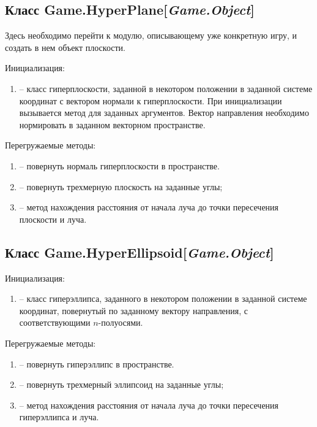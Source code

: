 \subsection{Класс Game.HyperPlane[\textit{Game.Object}]}
	Здесь необходимо перейти к модулю, описывающему уже конкретную игру, и создать в нем объект плоскости.

	\noindent Инициализация:
	\begin{enumerate}
		\item {} -- класс гиперплоскости, заданной в некотором положении в заданной системе координат с вектором нормали к гиперплоскости. При инициализации вызывается метод  для заданных аргументов. Вектор направления необходимо нормировать в заданном векторном пространстве.
	\end{enumerate}

	\noindent Перегружаемые методы:
	\begin{enumerate}
		\item {} -- повернуть нормаль гиперплоскости в пространстве.
		\item {} -- повернуть трехмерную плоскость на заданные углы;
		\item {} -- метод нахождения расстояния от начала луча до точки пересечения плоскости и луча.
	\end{enumerate}


\subsection{Класс Game.HyperEllipsoid[\textit{Game.Object}]}

	\noindent Инициализация:
	\begin{enumerate}
		\item {} -- класс гиперэллипса, заданного в некотором положении в заданной системе координат, повернутый по заданному вектору направления, с соответствующими $n$-полуосями.
	\end{enumerate}

	\noindent Перегружаемые методы:
	\begin{enumerate}
		\item {} -- повернуть гиперэллипс в пространстве.
		\item {} -- повернуть трехмерный эллипсоид на заданные углы;
		\item {} -- метод нахождения расстояния от начала луча до точки пересечения гиперэллипса и луча.
	\end{enumerate}


